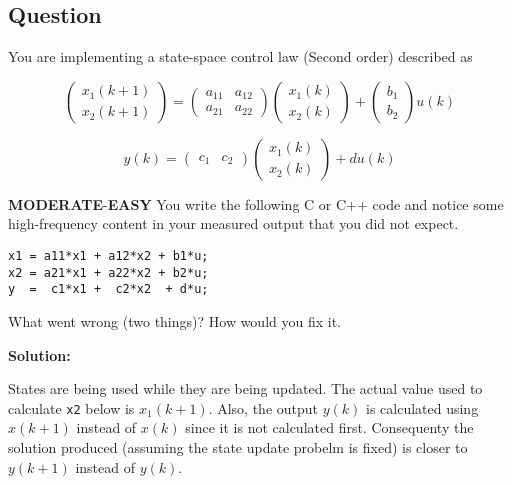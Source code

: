 \documentclass{article}
\newenvironment{Solution}{
\begin{tcolorbox}
\color{purple}
\textbf{Solution:}
}
{
\end{tcolorbox}
\ignorespacesafterend
}
\newcommand{\RatingBase}[2]{\textcolor{#1}{{\fontfamily{phv}\selectfont\textbf{#2}}}}
\newcommand{\Easy}{\RatingBase{green!50!black!50}{EASY}}
\newcommand{\Moderate}{\RatingBase{yellow!50!black!50}{MODERATE}}
\begin{document}
\subsection{Question}
You are implementing a state-space control law (Second order) described as

\begin{equation}
\left(\begin{matrix}
 x_1(k+1) \\ x_2(k+1)
\end{matrix}\right)
= \left(\begin{matrix}
a_{11} & a_{12} \\ a_{21} & a_{22}
\end{matrix}\right)
\left(
\begin{matrix}
 x_1(k) \\ x_2(k)
\end{matrix}
\right)
+
 \left(\begin{matrix}
b_{1}  \\ b_{2} 
\end{matrix}\right)
u(k)
\end{equation}

\begin{equation}
y(k)
= \left(\begin{matrix}
c_{1} & c_{2}
\end{matrix}\right)
\left(
\begin{matrix}
 x_1(k) \\ x_2(k)
\end{matrix}
\right)
+
d u(k)
\end{equation}

\Moderate{}-\Easy{} You write the following C or C++ code and notice some high-frequency content in your measured output that you did not expect.
\begin{lstlisting}
x1 = a11*x1 + a12*x2 + b1*u;
x2 = a21*x1 + a22*x2 + b2*u;
y  =  c1*x1 +  c2*x2  + d*u;
\end{lstlisting}

What went wrong (two things)?  How would you fix it.

\begin{Solution}
States are being used while they are being updated.  The actual value used to calculate \verb|x2| below is $x_1(k+1)$.
Also, the output $y(k)$ is calculated using $x(k+1)$ instead of $x(k)$ since it is not calculated first.  Consequenty the solution produced (assuming the state update probelm is fixed) is closer to $y(k+1)$ instead of $y(k)$.
\end{Solution}
\end{document}
